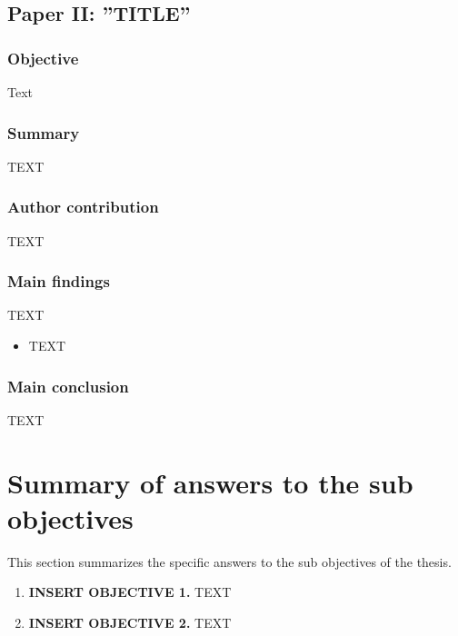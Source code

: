\newpage
\subsection{Paper II: ''TITLE''}
\subsubsection{Objective}
Text
\subsubsection{Summary}
TEXT
\subsubsection{Author contribution}
TEXT

\subsubsection{Main findings}
TEXT %
\begin{itemize}
 \item TEXT
\end{itemize}

\subsubsection{Main conclusion}
TEXT

\newpage
\section{Summary of answers to the sub objectives}\label{ch:subobj}
This section summarizes the specific answers to the sub objectives of the thesis. 
\begin{enumerate}
        \item \textbf{INSERT OBJECTIVE 1.} TEXT\\

        \item \textbf{INSERT OBJECTIVE 2.} TEXT \\
	    
  
\end{enumerate}
